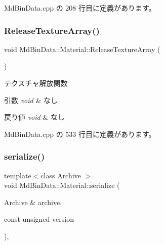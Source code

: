  Md\+Bin\+Data.\+cpp の 208 行目に定義があります。

\mbox{\label{class_md_bin_data_1_1_material_a052ceb2c797f8a24c89d988510e874ae}} 
\subsubsection{\texorpdfstring{Release\+Texture\+Array()}{ReleaseTextureArray()}}
{\footnotesize\ttfamily void Md\+Bin\+Data\+::\+Material\+::\+Release\+Texture\+Array (\begin{DoxyParamCaption}{ }\end{DoxyParamCaption})}



テクスチャ解放関数 


\begin{DoxyParams}{引数}
{\em void} & なし \\
\hline
\end{DoxyParams}

\begin{DoxyRetVals}{戻り値}
{\em void} & なし \\
\hline
\end{DoxyRetVals}


 Md\+Bin\+Data.\+cpp の 533 行目に定義があります。

\mbox{\label{class_md_bin_data_1_1_material_a5c3a4ba9a609aedbbaee7e0590ea27fc}} 
\subsubsection{\texorpdfstring{serialize()}{serialize()}}
{\footnotesize\ttfamily template$<$class Archive $>$ \\
void Md\+Bin\+Data\+::\+Material\+::serialize (\begin{DoxyParamCaption}\item[{Archive \&}]{archive,  }\item[{const unsigned}]{version }\end{DoxyParamCaption})\hspace{0.3cm}{\ttfamily [inline]}, {\ttfamily [private]}}



